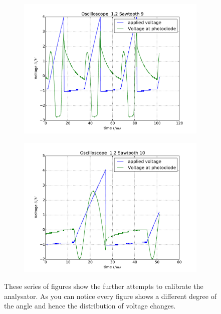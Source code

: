 \begin{figure}
\begin{subfigure}[b]{\picwidth}
        \includegraphics[width=\textwidth]{analysis/figures/12sawtooth9}
        \caption{}
    \end{subfigure}
    \begin{subfigure}[b]{\picwidth}
        \includegraphics[width=\textwidth]{analysis/figures/12sawtooth10}
        \caption{}
    \end{subfigure}

    \caption{These series of figures show the further 
        attempts to calibrate the analysator. As you can
        notice every figure shows a different degree of the 
        angle and hence the distribution of voltage changes. }
    \label{fig:saw2}
\end{figure}
\flushleft

